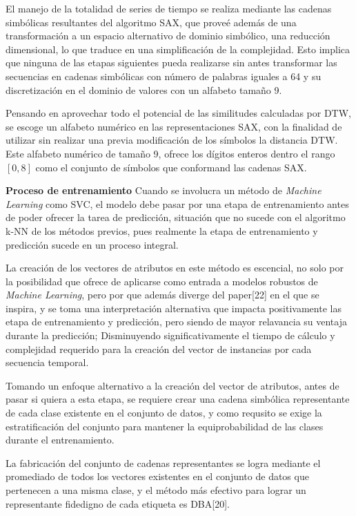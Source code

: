 	\hfill\break
	\justifying
	El manejo de la totalidad de series de tiempo se realiza mediante las cadenas simbólicas resultantes del algoritmo SAX, que proveé además de una transformación a un espacio alternativo de dominio simbólico, una reducción dimensional, lo que traduce en una simplificación de la complejidad. Esto implica que ninguna de las etapas siguientes pueda realizarse sin antes transformar las secuencias en cadenas simbólicas con número de palabras iguales a 64 y su discretización en el dominio de valores con un alfabeto tamaño 9.
	
	\hfill\break
	\justifying
	Pensando en aprovechar todo el potencial de las similitudes calculadas por DTW, se escoge un alfabeto numérico en las representaciones SAX, con la finalidad de utilizar sin realizar una previa modificación de los símbolos la distancia DTW. Este alfabeto numérico de tamaño 9, ofrece los dígitos enteros dentro el rango $[0,8]$ como el conjunto de símbolos que conformand las cadenas SAX.
	
	\hfill\break
	\textbf{Proceso de entrenamiento}
	\justifying
	Cuando se involucra un método de \textit{Machine Learning} como SVC, el modelo debe pasar por una etapa de entrenamiento antes de poder ofrecer la tarea de predicción, situación que no sucede con el algoritmo k-NN de los métodos previos, pues realmente la etapa de entrenamiento y predicción sucede en un proceso integral.
	
	\hfill\break
	\justifying
	La creación de los vectores de atributos en este método es escencial, no solo por la posibilidad que ofrece de aplicarse como entrada a modelos robustos de \textit{Machine Learning}, pero por que además diverge del paper[22] en el que se inspira, y se toma una interpretación alternativa que impacta positivamente las etapa de entrenamiento y predicción, pero siendo de mayor relavancia su ventaja durante la predicción; Disminuyendo significativamente el tiempo de cálculo y complejidad requerido para la creación del vector de instancias por cada secuencia temporal.
	
	\hfill\break
	\justifying
	Tomando un enfoque alternativo a la creación del vector de atributos, antes de pasar si quiera a esta etapa, se requiere crear una cadena simbólica representante de cada clase existente en el conjunto de datos, y como requsito se exige la estratificación del conjunto para mantener la equiprobabilidad de las clases durante el entrenamiento.
	
	\hfill\break
	\justifying
	La fabricación del conjunto de cadenas representantes se logra mediante el promediado de
	todos los vectores existentes en el conjunto de datos que pertenecen a una misma clase, y el método más efectivo para lograr un representante fidedigno de cada etiqueta es DBA[20].
	
